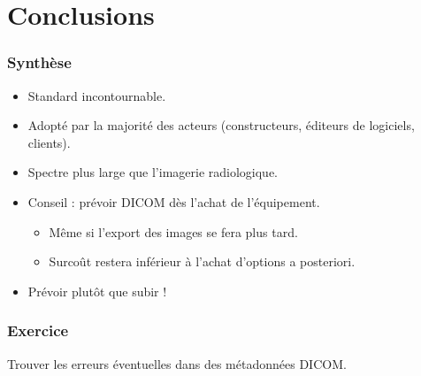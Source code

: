 \section{Conclusions}

\frame
{
	\frametitle{Synth\`ese}
	
	\begin{itemize}
		\item Standard incontournable.
		\item<2-> Adopt\'e par la majorit\'e des acteurs (constructeurs, \'editeurs de logiciels, clients).
		\item<3-> Spectre plus large que l'imagerie radiologique.
		\item<4-> Conseil : pr\'evoir DICOM d\`es l'achat de l'\'equipement.
		\begin{itemize}
			\item<5-> M\^eme si l'export des images se fera plus tard.
			\item<6-> Surco\^ut restera inf\'erieur \`a l'achat d'options a posteriori.
		\end{itemize}
		\item<7-> Pr\'evoir plut\^ot que subir !
	\end{itemize}
}

\frame
{
    \frametitle{Exercice}
    Trouver les erreurs \'eventuelles dans des m\'etadonn\'ees DICOM.
}

